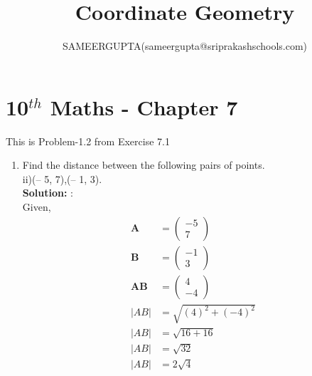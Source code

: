 \documentclass[12pt]{article}
\title{Coordinate Geometry}
\author{SAMEERGUPTA(sameergupta@sriprakashschools.com)}
\newcommand{\myvec}[1]{\ensuremath{\begin{pmatrix}#1\end{pmatrix}}}
\newcommand{\solution}{\noindent \textbf{Solution: }}
\let\vec\mathbf
\begin{document}
\maketitle
\section*{10$^{th}$ Maths - Chapter 7}
This is Problem-1.2 from Exercise 7.1
\begin{enumerate}
\item Find the distance between the following pairs of points.\\
 ii)(– 5, 7),(– 1, 3).\\
\solution:\\
Given,
\begin{align}
\vec{A}&=\myvec{-5\\7}\\
\vec{B}&=\myvec{-1\\3}\\
\vec{AB}&=\myvec{4\\-4}\\
|AB|&=\sqrt{(4)^2+(-4)^2}\\
|AB|&=\sqrt{16+16}\\
|AB|&=\sqrt{32}\\
|AB|&=2\sqrt{4}\\
\end{align}
\end{enumerate}
\end{document}
